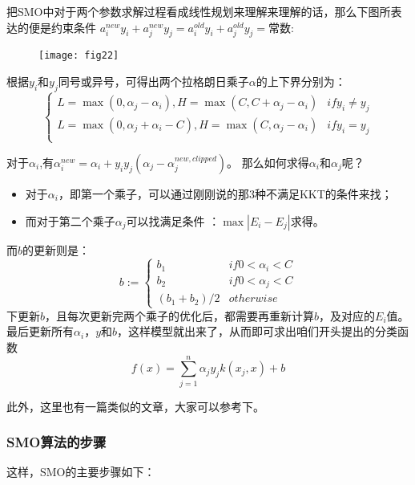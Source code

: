 \documentclass[a4paper,12pt]{article}
\begin{document}
把SMO中对于两个参数求解过程看成线性规划来理解来理解的话，那么下图所表达的便是约束条件
$ a_i^{new}y_i+a_j^{new}y_j= a_i^{old}y_i+a_j^{old}y_j=\text{常数}$:

\begin{figure}[H]
  \centering
  \texttt{[image: fig22]}
\end{figure}

根据$y_i$和$y_j$同号或异号，可得出两个拉格朗日乘子$\alpha$的上下界分别为：
\begin{equation}
  \left\{\begin{array}{lr}
      L=\max(0,\alpha_j-\alpha_i),H=\max(C,C+\alpha_j-\alpha_i) & if y_i\neq y_j\\
      L=\max(0,\alpha_j+\alpha_i-C),H=\max(C,\alpha_j-\alpha_i) & if y_i= y_j\\
    \end{array}
    \right.
\end{equation}

对于$\alpha_i$,有$\alpha_i^{new}=\alpha_i+y_iy_j(\alpha_j-\alpha_j^{new,clipped})$。
那么如何求得$\alpha_i$和$\alpha_j$呢？
\begin{itemize}
    \item 对于$\alpha_i$，即第一个乘子，可以通过刚刚说的那3种不满足KKT的条件来找；
    \item 而对于第二个乘子$\alpha_j$可以找满足条件 ：$\max|E_i-E_j|$求得。
\end{itemize}
而$b$的更新则是：
\begin{equation}
  b:=\left\{\begin{array}{ll}
      b_1 & if 0<\alpha_i<C\\
      b_2 & if 0<\alpha_j<C\\
      (b_1+b_2)/2 & otherwise
    \end{array}
  \right.
\end{equation}
下更新$b$，且每次更新完两个乘子的优化后，都需要再重新计算$b$，及对应的$E_i$值。
最后更新所有$\alpha_i$，$y$和$b$，这样模型就出来了，从而即可求出咱们开头提出的分类函数
\begin{equation}
  f(x)=\sum_{j=1}^n\alpha_jy_jk(x_j,x)+b
\end{equation}

此外，这里也有一篇类似的文章，大家可以参考下。
\subsubsection{SMO算法的步骤}
这样，SMO的主要步骤如下：
\end{document}
